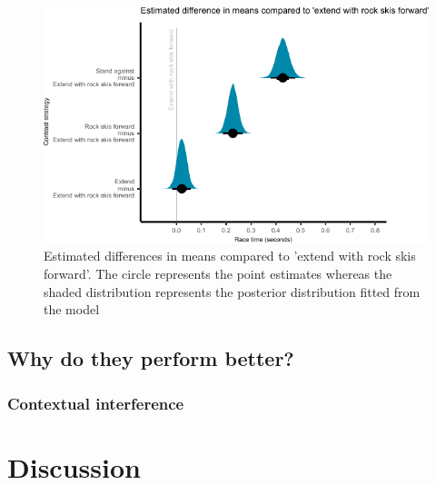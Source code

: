 \documentclass[letterpaper,10pt]{article}
\begin{document}
\begin{figure}[H]
\centering
\includegraphics{figure_results_Q1_strategies.pdf}
\caption{Estimated differences in means compared to 'extend with rock skis forward'. The circle represents the point estimates whereas the shaded distribution represents the posterior distribution fitted from the model}
\label{fig:q1_strategieseffect}
\end{figure}

\subsection{Why do they perform better?}


\subsubsection{Contextual interference}







\section{Discussion}

\section{}

\printbibliography
\end{document}
